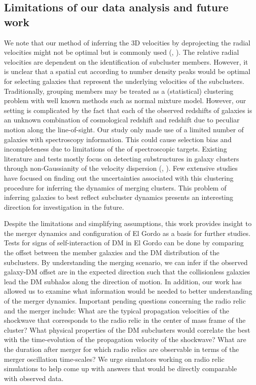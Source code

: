 \subsection{Limitations of our data analysis and future work} 
We note that our method of inferring the 3D velocities by deprojecting the
radial velocities might not be optimal but is commonly used (,
\citealt{Dawson12}). The relative
radial velocities are dependent on the identification of subcluster members.
However, it is unclear that a spatial
cut according to number density peaks would be optimal for selecting
galaxies that represent the underlying velocities of the subclusters. Traditionally, grouping members
may be treated as a (statistical) clustering problem with well known
methods such as normal mixture model. However, our setting is complicated
by the fact that each of the observed redshifts of galaxies is an unknown combination of cosmological redshift
and redshift due to peculiar motion along the line-of-sight. Our study
only made use of a limited number of galaxies with spectroscopy
information. This could cause selection bias and incompleteness due to
limitations of the of spectroscopic targets. Existing
literature and tests mostly focus on detecting substructures in galaxy
clusters through non-Gaussianity of the velocity dispersion
(\citealt{Dressler88},
\citealt{Einasto12}). Few extensive studies have focused on finding out the uncertainties
associated with this clustering procedure for inferring the dynamics of
merging clusters. This problem of inferring galaxies to best reflect
subcluster dynamics presents an interesting direction for investigation in the future.   
 
Despite the limitations and simplifying assumptions, this work provides
insight to the merger dynamics and configuration of El Gordo as a basis for further studies.
Tests for signs of self-interaction of DM in El Gordo  can be done
by comparing the offset between the member galaxies and the
DM distribution of the subclusters. By understanding the merging scenario,
we can infer if the observed galaxy-DM offset are in the expected
direction such that the collisionless galaxies lead the DM subhalos along
the direction of motion. In addition, our work has allowed us to examine
what information would be needed to better understanding of the merger
dynamics. Important pending questions concerning the radio relic and the
merger  include:  What are the typical propagation velocities of the shockwave that
corresponds to the radio relic in the	center of mass frame of the cluster?
What physical properties of the DM subclusters would correlate the best with the
time-evolution of the propagation velocity of the shockwave?  What are the duration
after merger for which radio relics are observable in terms of the merger
oscillation time-scales? We urge simulators working on radio relic
simulations to help come up with answers that would be directly
comparable with observed data. \par 

